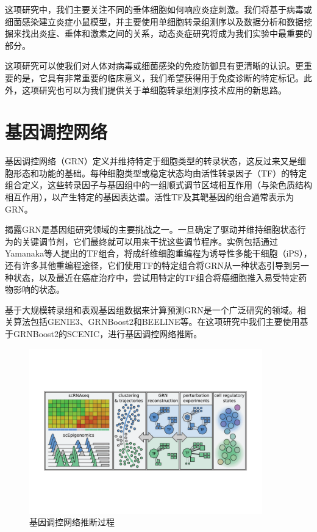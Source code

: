   这项研究中，我们主要关注不同的垂体细胞如何响应炎症刺激。我们将基于病毒或细菌感染建立炎症小鼠模型，并主要使用单细胞转录组测序以及数据分析和数据挖掘来找出炎症、垂体和激素之间的关系，动态炎症研究将成为我们实验中最重要的部分。

  这项研究可以使我们对人体对病毒或细菌感染的免疫防御具有更清晰的认识。更重要的是，它具有非常重要的临床意义，我们希望获得用于免疫诊断的特定标记。此外，这项研究也可以为我们提供关于单细胞转录组测序技术应用的新思路。

\section{基因调控网络}
  基因调控网络（GRN）定义并维持特定于细胞类型的转录状态，这反过来又是细胞形态和功能的基础。每种细胞类型或稳定状态均由活性转录因子（TF）的特定组合定义，这些转录因子与基因组中的一组顺式调节区域相互作用（与染色质结构相互作用），以产生特定的基因表达谱\cite{fiers2018mapping,arendt2016origin}。活性TF及其靶基因的组合通常表示为GRN。

  揭露GRN是基因组研究领域的主要挑战之一。一旦确定了驱动并维持细胞状态行为的关键调节剂，它们最终就可以用来干扰这些调节程序。实例包括通过Yamanaka等人\cite{takahashi2006induction}提出的TF组合，将成纤维细胞重编程为诱导性多能干细胞（iPS），还有许多其他重编程途径，它们使用TF的特定组合将GRN从一种状态引导到另一种状态\cite{marro2011direct,ieda2010direct}，以及最近在癌症治疗中，尝试用特定的TF组合将癌细胞推入易受特定药物影响的状态\cite{creixell2012navigating,wouters2017decoding}。

  基于大规模转录组和表观基因组数据来计算预测GRN是一个广泛研究的领域。相关算法包括GENIE3\cite{huynh2010inferring}、GRNBoost2\cite{moerman2019grnboost2}和BEELINE\cite{pratapa2020benchmarking}等。在这项研究中我们主要使用基于GRNBoost2的SCENIC\cite{aibar2017scenic,van2020scalable}，进行基因调控网络推断。

\begin{figure}[!htb]
  \centering
  \includegraphics[width=0.9\textwidth]{figs/scgrn-infer.pdf}
  \caption{基因调控网络推断过程}
  \label{fig:scgrn-infer}
\end{figure}

